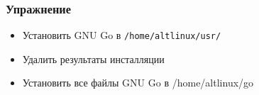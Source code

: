 \begin{frame}
 \frametitle{Упражнение}
  \begin{itemize}
    \item Установить GNU Go в \texttt{/home/altlinux/usr/}
    \item Удалить результаты инсталляции
    \item Установить все файлы GNU Go в /home/altlinux/go
  \end{itemize}
\end{frame}

%
%
%
%
%
%
